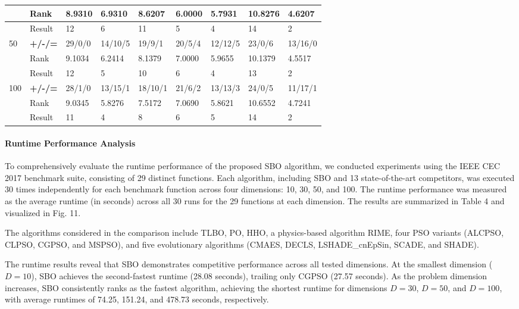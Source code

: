\documentclass{article} %
\begin{document}
\begin{tabular}{|p{0.5in}|p{0.3in}|p{0.4in}|p{0.4in}|p{0.4in}|p{0.4in}|p{0.8in}|p{0.4in}|p{0.4in}|}
 & Rank & 8.9310 & 6.9310 & 8.6207 & 6.0000 & 5.7931 & 10.8276 & 4.6207 \\ \hline 
 & Result & 12 & 6 & 11 & 5 & 4 & 14 & 2 \\ \hline 
50 & \textbf{+/-/=} & 29/0/0 & 14/10/5 & 19/9/1 & 20/5/4 & 12/12/5 & 23/0/6 & 13/16/0 \\ \hline 
 & Rank & 9.1034 & 6.2414 & 8.1379 & 7.0000 & 5.9655 & 10.1379 & 4.5517 \\ \hline 
 & Result & 12 & 5 & 10 & 6 & 4 & 13 & 2 \\ \hline 
100 & \textbf{+/-/=} & 28/1/0 & 13/15/1 & 18/10/1 & 21/6/2 & 13/13/3 & 24/0/5 & 11/17/1 \\ \hline 
 & Rank & 9.0345 & 5.8276 & 7.5172 & 7.0690 & 5.8621 & 10.6552 & 4.7241 \\ \hline 
 & Result & 11 & 4 & 8 & 6 & 5 & 14 & 2 \\ \hline 
\end{tabular}




\paragraph{ Runtime Performance Analysis}

To comprehensively evaluate the runtime performance of the proposed SBO algorithm, we conducted experiments using the IEEE CEC 2017 benchmark suite, consisting of 29 distinct functions. Each algorithm, including SBO and 13 state-of-the-art competitors, was executed 30 times independently for each benchmark function across four dimensions: 10, 30, 50, and 100. The runtime performance was measured as the average runtime (in seconds) across all 30 runs for the 29 functions at each dimension. The results are summarized in Table 4 and visualized in Fig. 11.

The algorithms considered in the comparison include TLBO, PO, HHO, a physics-based algorithm RIME, four PSO variants (ALCPSO, CLPSO, CGPSO, and MSPSO), and five evolutionary algorithms (CMAES, DECLS, LSHADE\_cnEpSin, SCADE, and SHADE).

The runtime results reveal that SBO demonstrates competitive performance across all tested dimensions. At the smallest dimension ($D=10$), SBO achieves the second-fastest runtime (28.08 seconds), trailing only CGPSO (27.57 seconds). As the problem dimension increases, SBO consistently ranks as the fastest algorithm, achieving the shortest runtime for dimensions $D=30$, $D=50$, and $D=100$, with average runtimes of 74.25, 151.24, and 478.73 seconds, respectively.
\end{document}
